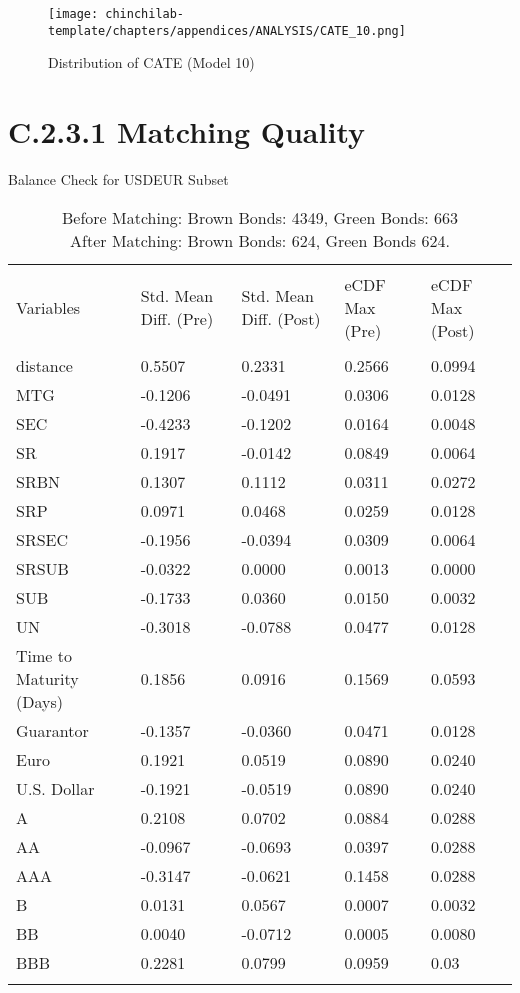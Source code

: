 \begin{figure}[H]
    \centering
    \texttt{[image: chinchilab-template/chapters/appendices/ANALYSIS/CATE\_10.png]}
    \caption{Distribution of CATE (Model 10)}
    \label{fig:my_label}
\end{figure}

\section{C.2.3.1 Matching Quality}

\begin{table}[H]
\centering
\footnotesize
\caption{Balance Check for USDEUR Subset}
\begin{tabular}{lllll}
\\[-1.8ex]\hline 
\hline \\[-1.8ex] 
Variables & Std. Mean Diff. (Pre) & Std. Mean Diff. (Post) & eCDF Max (Pre) & eCDF Max (Post) \\
 \hline \\[-1.8ex] 
distance & 0.5507 & 0.2331 & 0.2566 & 0.0994 \\
MTG & -0.1206 & -0.0491 & 0.0306 & 0.0128 \\
SEC & -0.4233 & -0.1202 & 0.0164 & 0.0048 \\
SR & 0.1917 & -0.0142 & 0.0849 & 0.0064 \\
SRBN & 0.1307 & 0.1112 & 0.0311 & 0.0272 \\
SRP & 0.0971 & 0.0468 & 0.0259 & 0.0128 \\
SRSEC & -0.1956 & -0.0394 & 0.0309 & 0.0064 \\
SRSUB & -0.0322 & 0.0000 & 0.0013 & 0.0000 \\
SUB & -0.1733 & 0.0360 & 0.0150 & 0.0032 \\
UN & -0.3018 & -0.0788 & 0.0477 & 0.0128 \\
Time to Maturity (Days) & 0.1856 & 0.0916 & 0.1569 & 0.0593 \\
Guarantor & -0.1357 & -0.0360 & 0.0471 & 0.0128 \\
Euro & 0.1921 & 0.0519 & 0.0890 & 0.0240 \\
U.S. Dollar & -0.1921 & -0.0519 & 0.0890 & 0.0240 \\
A & 0.2108 & 0.0702 & 0.0884 & 0.0288 \\
AA & -0.0967 & -0.0693 & 0.0397 & 0.0288 \\
AAA & -0.3147 & -0.0621 & 0.1458 & 0.0288 \\
B & 0.0131 & 0.0567 & 0.0007 & 0.0032 \\
BB & 0.0040 & -0.0712 & 0.0005 & 0.0080 \\
BBB & 0.2281 & 0.0799 & 0.0959 & 0.03 \\
\hline \\[-1.8ex] 
\end{tabular}
\caption*{Before Matching: Brown Bonds: 4349, Green Bonds: 663 \\
After Matching: Brown Bonds: 624, Green Bonds 624.}
\end{table}


